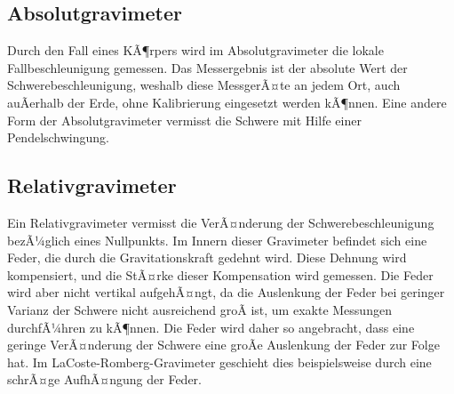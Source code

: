 \subsection{Absolutgravimeter}
Durch den Fall eines KÃ¶rpers wird im Absolutgravimeter die lokale Fallbeschleunigung gemessen. Das Messergebnis ist der absolute Wert der Schwerebeschleunigung, weshalb diese MessgerÃ¤te an jedem Ort, auch auÃerhalb der Erde, ohne Kalibrierung eingesetzt werden kÃ¶nnen.
Eine andere Form der Absolutgravimeter vermisst die Schwere mit Hilfe einer Pendelschwingung.

\subsection{Relativgravimeter}
Ein Relativgravimeter vermisst die VerÃ¤nderung der Schwerebeschleunigung bezÃ¼glich eines Nullpunkts. Im Innern dieser Gravimeter befindet sich eine Feder, die durch die Gravitationskraft gedehnt wird. Diese Dehnung wird kompensiert, und die StÃ¤rke dieser Kompensation wird gemessen. Die Feder wird aber nicht vertikal aufgehÃ¤ngt, da die Auslenkung der Feder bei geringer Varianz der Schwere nicht ausreichend groÃ ist, um exakte Messungen durchfÃ¼hren zu kÃ¶nnen. Die Feder wird daher so angebracht, dass eine geringe VerÃ¤nderung der Schwere eine groÃe Auslenkung der Feder zur Folge hat. Im LaCoste-Romberg-Gravimeter geschieht dies beispielsweise durch eine schrÃ¤ge AufhÃ¤ngung der Feder. 









